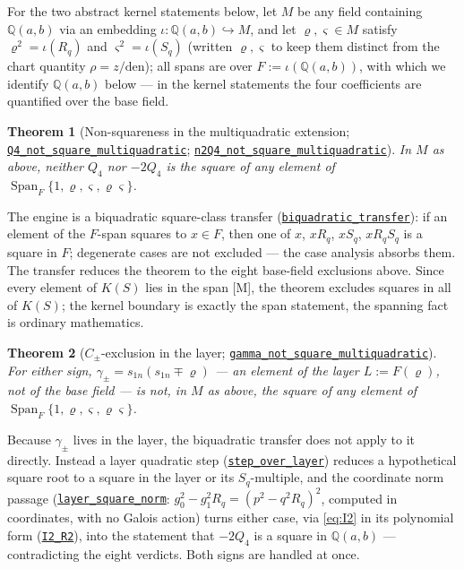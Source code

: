 \documentclass[11pt]{amsart}
\newtheorem{theorem}{Theorem}[section]
\newcommand{\Q}{\mathbb{Q}}
\newcommand{\repourl}{https://github.com/hirokifukui/rd-quartics-classification}
\newcommand{\repotag}{v1.1.0}
\newcommand{\leanline}[3]{\href{\repourl/blob/\repotag/#1\#L#2}{\texttt{#3}}}
\begin{document}
For the two abstract kernel statements below, let $M$ be any field
containing $\Q(a,b)$ via an embedding
$\iota\colon\Q(a,b)\hookrightarrow M$, and let
$\varrho,\varsigma\in M$ satisfy $\varrho^{2}=\iota(R_{q})$ and
$\varsigma^{2}=\iota(S_{q})$ (written $\varrho,\varsigma$ to keep
them distinct from the chart quantity $\rho=z/\mathrm{den}$); all
spans are over $F:=\iota(\Q(a,b))$, with which we identify
$\Q(a,b)$ below --- in the kernel statements the four coefficients are
quantified over the base field.

\begin{theorem}[Non-squareness in the multiquadratic extension;
\leanline{Gap/BMThm7SquareClass.lean}{293}{Q4\_not\_square\_multiquadratic};
\leanline{Gap/BMThm7SquareClass.lean}{315}{n2Q4\_not\_square\_multiquadratic}]
\label{thm:multiquad}
In $M$ as above, neither $Q_{4}$ nor $-2Q_{4}$ is the square of any
element of
$\operatorname{Span}_{F}\{1,\varrho,\varsigma,\varrho\varsigma\}$.
\end{theorem}

The engine is a biquadratic square-class transfer
(\leanline{Gap/BMThm7SquareClass.lean}{81}{biquadratic\_transfer}):
if an element of the $F$-span squares to $x \in F$, then one of $x$,
$xR_{q}$, $xS_{q}$, $xR_{q}S_{q}$ is a square in $F$; degenerate cases are not excluded ---
the case analysis absorbs them.  The transfer reduces the theorem to
the eight base-field exclusions above.  Since every element of $K(S)$
lies in the span [M], the theorem excludes squares in all of $K(S)$;
the kernel boundary is exactly the span statement, the spanning fact
is ordinary mathematics.

\begin{theorem}[$C_{\pm}$-exclusion in the layer;
\leanline{Gap/BMThm7NormCriterion.lean}{272}{gamma\_not\_square\_multiquadratic}]
\label{thm:gamma}
For either sign, $\gamma_{\pm}=s_{1n}(s_{1n}\mp\varrho)$ --- an
element of the layer $L:=F(\varrho)$, not of the base
field --- is not, in $M$ as above, the square of any element of
$\operatorname{Span}_{F}\{1,\varrho,\varsigma,\varrho\varsigma\}$.
\end{theorem}

Because $\gamma_{\pm}$ lives in the layer, the biquadratic transfer
does not apply to it directly.  Instead a layer quadratic step
(\leanline{Gap/BMThm7NormCriterion.lean}{87}{step\_over\_layer})
reduces a hypothetical square root to a square in the layer or its
$S_{q}$-multiple, and the coordinate norm passage
(\leanline{Gap/BMThm7NormCriterion.lean}{236}{layer\_square\_norm}:
$g_{0}^{2}-g_{1}^{2}R_{q}=(p^{2}-q^{2}R_{q})^{2}$, computed in
coordinates, with no Galois action) turns either case, via
\eqref{eq:I2} in its polynomial form
(\leanline{Gap/BMThm7NormCriterion.lean}{38}{I2\_R2}), into the
statement that $-2Q_{4}$ is a square in $\Q(a,b)$ --- contradicting
the eight verdicts.  Both signs are handled at once.
\end{document}
